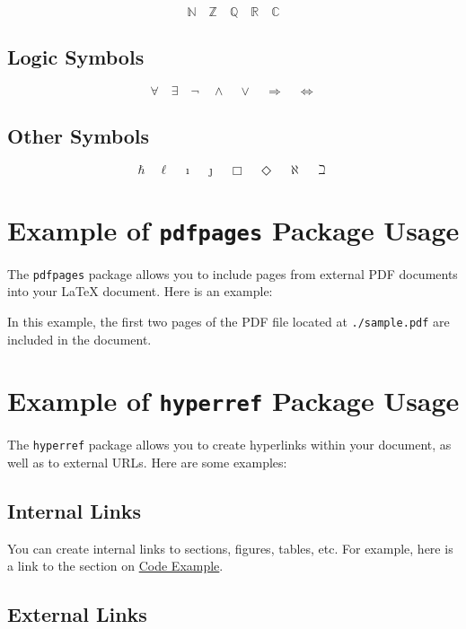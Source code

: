 \documentclass[]{article}
\begin{document}
\[
\mathbb{N} \quad \mathbb{Z} \quad \mathbb{Q} \quad \mathbb{R} \quad \mathbb{C}
\]

\subsection{Logic Symbols}

\[
\forall \quad \exists \quad \neg \quad \wedge \quad \vee \quad \Rightarrow \quad \Leftrightarrow
\]

\subsection{Other Symbols}

\[
\hbar \quad \ell \quad \imath \quad \jmath \quad \Box \quad \Diamond \quad \aleph \quad \beth
\]

\section{Example of \texttt{pdfpages} Package Usage}

The \texttt{pdfpages} package allows you to include pages from external PDF documents into your LaTeX document. Here is an example:



In this example, the first two pages of the PDF file located at \texttt{./sample.pdf} are included in the document.


\section{Example of \texttt{hyperref} Package Usage}

The \texttt{hyperref} package allows you to create hyperlinks within your document, as well as to external URLs. Here are some examples:

\subsection{Internal Links}

You can create internal links to sections, figures, tables, etc. For example, here is a link to the section on \hyperref[sec:code-example]{Code Example}.

\subsection{External Links}
\end{document}
